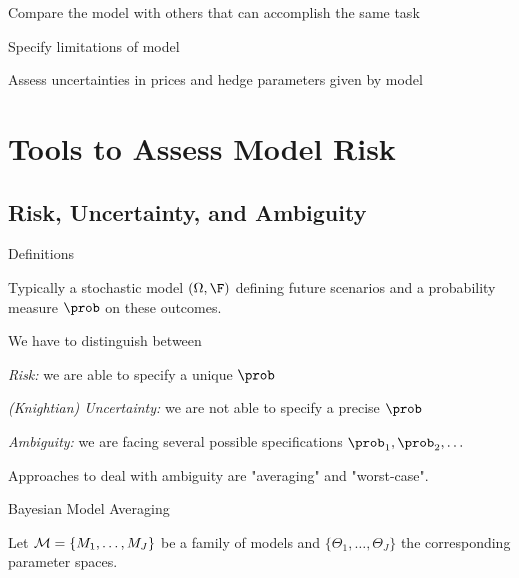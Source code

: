 	Compare the model with others that can accomplish the same task

	Specify limitations of model

	Assess uncertainties in prices and hedge parameters given by model
















\section{Tools to Assess Model Risk}
\subsection{Risk, Uncertainty, and Ambiguity}

{Definitions}






	Typically a stochastic model $(\Omega, \F)$ defining future scenarios and a
probability measure $\prob$ on these outcomes.

	We have to distinguish between






	{\it Risk:}  we are able to specify a unique $\prob$

	{\it (Knightian) Uncertainty:} we are not able to specify a precise $\prob$

	{\it Ambiguity:}  we are facing several possible specifications $\prob_1, \prob_2, \ldots$%

	Approaches to deal with ambiguity are "averaging" and "worst-case".






{Bayesian Model Averaging}






	Let ${\cal M}= \{M_1, \dots, M_J\}$ be a family of models and  $\{\Theta_1, \dots, \Theta_J\}$ the corresponding parameter spaces.

